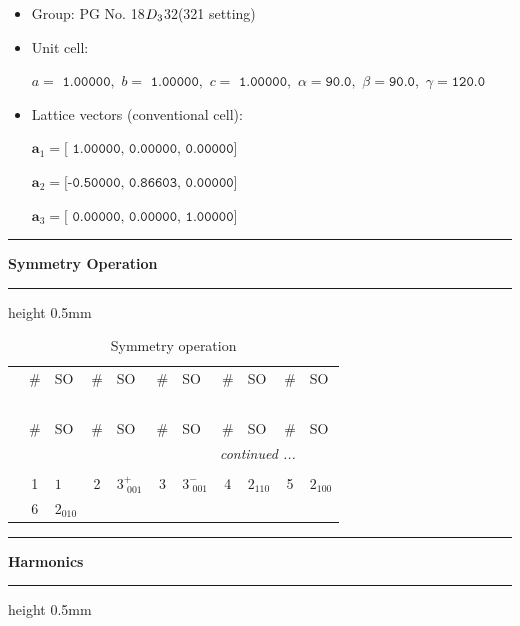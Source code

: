 \documentclass[fleqn,10pt,landscape]{jsarticle}
\begin{document}
\begin{itemize}
\item Group: PG No. 18\quad$D_{\rm 3}$\quad$32$\quad(321 setting)\quad[ trigonal ]
\end{itemize}
\begin{itemize}
\item Unit cell:

\quad $a=\texttt{ 1.00000},\,\, b=\texttt{ 1.00000},\,\, c=\texttt{ 1.00000},\,\, \alpha=\texttt{90.0},\,\, \beta=\texttt{90.0},\,\, \gamma=\texttt{120.0}$

\item Lattice vectors (conventional cell):

\quad $\bm{a}_1=\texttt{[ 1.00000, 0.00000, 0.00000]}$

\quad $\bm{a}_2=\texttt{[-0.50000, 0.86603, 0.00000]}$

\quad $\bm{a}_3=\texttt{[ 0.00000, 0.00000, 1.00000]}$

\end{itemize}
\vspace{5mm}
\noindent \rule[0.5mm]{5mm}{0.5mm}\hspace{3mm}\textbf{Symmetry Operation}\hspace{3mm}\leaders\hrule height 0.5mm\hfill\kern0pt
\vspace{3mm}

\renewcommand{\arraystretch}{1.6}
\begin{longtable}[l]{c|cl|cl|cl|cl|cl}
\captionsetup{justification=raggedright, singlelinecheck=off}
\caption{Symmetry operation}
 \\
 \hline \hline
 & \# & SO & \# & SO & \# & SO & \# & SO & \# & SO \\ \hline \endfirsthead

\multicolumn{10}{l}{\tablename\ \thetable{}} \\
 \hline \hline
 & \# & SO & \# & SO & \# & SO & \# & SO & \# & SO \\ \hline \endhead

 \hline \hline
\multicolumn{10}{r}{\footnotesize\it continued ...} \\ \endfoot

 \hline \hline
\multicolumn{10}{r}{} \\ \endlastfoot

 & 1 & $1$ & 2 & $3^{+}_{\,\,001}$ & 3 & $3^{-}_{\,\,001}$ & 4 & $2{}_{110}$ & 5 & $2{}_{100}$ \\
& 6 & $2{}_{010}$ &  &  &  &  &  &  &  &  \\
\end{longtable}
\vspace{5mm}
\noindent \rule[0.5mm]{5mm}{0.5mm}\hspace{3mm}\textbf{Harmonics}\hspace{3mm}\leaders\hrule height 0.5mm\hfill\kern0pt
\vspace{3mm}
\end{document}
